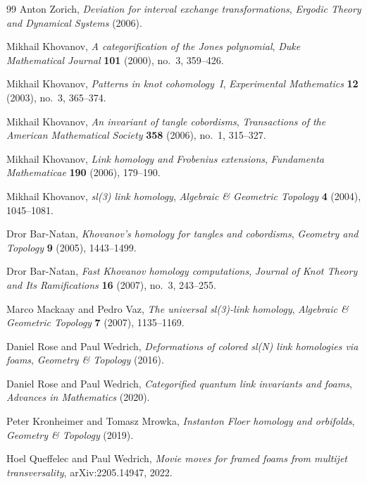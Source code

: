\documentclass[12pt, a4paper]{article}
\theoremstyle{plain}
\theoremstyle{definition}
\theoremstyle{correspondence}
\begin{document}
\begin{thebibliography}{99}
Anton Zorich,
\textit{Deviation for interval exchange transformations},
\textit{Ergodic Theory and Dynamical Systems} (2006).


Mikhail Khovanov,
\textit{A categorification of the Jones polynomial},
\textit{Duke Mathematical Journal} \textbf{101} (2000), no.~3, 359--426.

Mikhail Khovanov,
\textit{Patterns in knot cohomology~I},
\textit{Experimental Mathematics} \textbf{12} (2003), no.~3, 365--374.

Mikhail Khovanov,
\textit{An invariant of tangle cobordisms},
\textit{Transactions of the American Mathematical Society} \textbf{358} (2006), no.~1, 315--327.

Mikhail Khovanov,
\textit{Link homology and Frobenius extensions},
\textit{Fundamenta Mathematicae} \textbf{190} (2006), 179--190.

Mikhail Khovanov,
\textit{sl(3) link homology},
\textit{Algebraic \& Geometric Topology} \textbf{4} (2004), 1045--1081.

Dror Bar-Natan,
\textit{Khovanov's homology for tangles and cobordisms},
\textit{Geometry and Topology} \textbf{9} (2005), 1443--1499.

Dror Bar-Natan,
\textit{Fast Khovanov homology computations},
\textit{Journal of Knot Theory and Its Ramifications} \textbf{16} (2007), no.~3, 243--255.

Marco Mackaay and Pedro Vaz,
\textit{The universal sl(3)-link homology},
\textit{Algebraic \& Geometric Topology} \textbf{7} (2007), 1135--1169.

Daniel Rose and Paul Wedrich,
\textit{Deformations of colored sl(N) link homologies via foams},
\textit{Geometry \& Topology} (2016).

Daniel Rose and Paul Wedrich,
\textit{Categorified quantum link invariants and foams},
\textit{Advances in Mathematics} (2020).

Peter Kronheimer and Tomasz Mrowka,
\textit{Instanton Floer homology and orbifolds},
\textit{Geometry \& Topology} (2019).

Hoel Queffelec and Paul Wedrich,
\textit{Movie moves for framed foams from multijet transversality},
arXiv:2205.14947, 2022.



\end{thebibliography}
\end{document}
